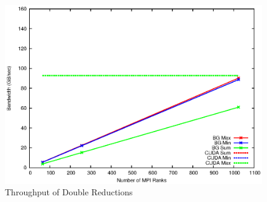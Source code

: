 \documentclass[12pt]{article}
\begin{document}
\begin{figure}
	\includegraphics[width=\textwidth]{mpi/double.eps}
	\caption{Throughput of Double Reductions}
\end{figure}
 
\end{document}
